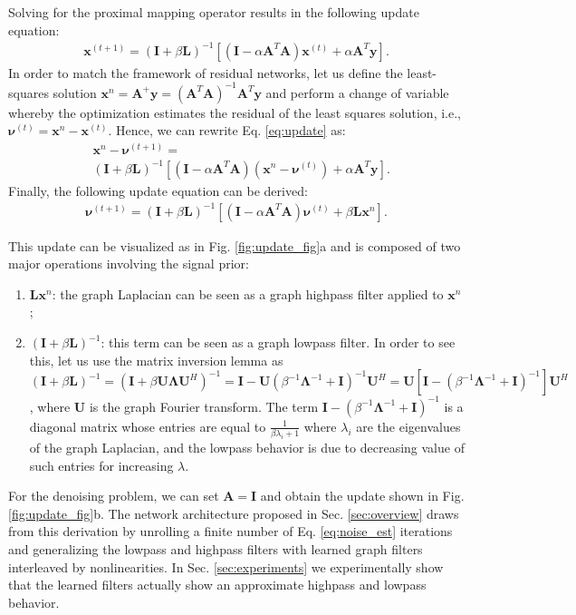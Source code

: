\documentclass[journal]{IEEEtran}
\newcommand{\nub}{\bm{\nu}}
\newcommand{\Lambdab}{\bm{\Lambda}}
\newcommand{\Ab}{\mathbf{A}}
\newcommand{\Ib}{\mathbf{I}}
\newcommand{\Lb}{\mathbf{L}}
\newcommand{\Ub}{\mathbf{U}}
\newcommand{\xb}{\mathbf{x}}
\newcommand{\yb}{\mathbf{y}}
\begin{document}
Solving for the proximal mapping operator results in the following update equation:
\begin{align}\label{eq:update}
    \xb^{(t+1)} =  \left( \Ib +\beta \Lb \right)^{-1}  \left[ (\Ib-\alpha\Ab^T\Ab)\xb^{(t)} + \alpha \Ab^T \yb \right].
\end{align}
In order to match the framework of residual networks, let us define the least-squares solution $\xb^n=\Ab^{+}\yb=\left( \Ab^T\Ab \right)^{-1}\Ab^T \yb$ and perform a change of variable whereby the optimization estimates the residual of the least squares solution, i.e., $\nub^{(t)}=\xb^n - \xb^{(t)}$. Hence, we can rewrite Eq. \eqref{eq:update} as:
\begin{align*}
    &\xb^n - \nub^{(t+1)} =\\&\left( \Ib +\beta \Lb \right)^{-1}  \left[ \left( \Ib-\alpha\Ab^T\Ab \right) \left( \xb^n-\nub^{(t)} \right) + \alpha \Ab^T \yb \right].
\end{align*}
Finally, the following update equation can be derived:
\begin{align}\label{eq:noise_est}
   \nub^{(t+1)} = \left( \Ib +\beta \Lb \right)^{-1}  \left[ \left( \Ib-\alpha\Ab^T\Ab \right) \nub^{(t)}  + \beta \Lb \xb^n \right].
\end{align}



This update can be visualized as in Fig. \ref{fig:update_fig}a and is composed of two major operations involving the signal prior:
\begin{enumerate}
    \item $\Lb \xb^n$: the graph Laplacian can be seen as a graph highpass filter applied to $\xb^n$;
    \item $\left( \Ib +\beta \Lb \right)^{-1}$: this term can be seen as a graph lowpass filter. In order to see this, let us use the matrix inversion lemma as $\left( \Ib +\beta \Lb \right)^{-1} = \left( \Ib +\beta \Ub \Lambdab \Ub^H \right)^{-1} = \Ib - \Ub \left( \beta^{-1}\Lambdab^{-1} + \Ib \right)^{-1} \Ub^H = \Ub \left[ \Ib - \left(\beta^{-1}\Lambdab^{-1} + \Ib \right)^{-1} \right] \Ub^H$, where $\Ub$ is the graph Fourier transform. The term $\Ib - \left(\beta^{-1}\Lambdab^{-1} + \Ib \right)^{-1}$ is a diagonal matrix whose entries are equal to $\frac{1}{\beta\lambda_i+1}$ where $\lambda_i$ are the eigenvalues of the graph Laplacian, and the lowpass behavior is due to decreasing value of such entries for increasing $\lambda$.
\end{enumerate}
For the denoising problem, we can set $\Ab=\Ib$ and obtain the update shown in Fig.\ref{fig:update_fig}b.
The network architecture proposed in Sec. \ref{sec:overview} draws from this derivation by unrolling a finite number of Eq. \eqref{eq:noise_est} iterations and generalizing the lowpass and highpass filters with learned graph filters interleaved by nonlinearities. In Sec. \ref{sec:experiments} we experimentally show that the learned filters actually show an approximate highpass and lowpass behavior.
\end{document}
